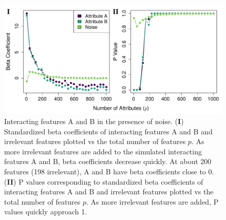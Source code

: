 \documentclass[10pt,letterpaper]{article}\usepackage[]{graphicx}\usepackage[]{color}
\begin{document}


\begin{figure}[H]
	\centering
	\includegraphics[width=1\textwidth]{betas_and_pvals_vs_p_ABC.pdf}
	\caption{Interacting features A and B in the presence of noise. (\textbf{I}) Standardized beta coefficients of interacting features A and B and irrelevant features plotted vs the total number of features $p$. As more irrelevant features are added to the simulated interacting features A and B, beta coefficients decrease quickly. At about 200 features (198 irrelevant), A and B have beta coefficients close to 0. (\textbf{II}) P values corresponding to standardized beta coefficients of interacting features A and B and irrelevant features plotted vs the total number of features $p$. As more irrelevant features are added, P values quickly approach 1.}\label{fig:ABC_plus_noise}
\end{figure}
\end{document}
